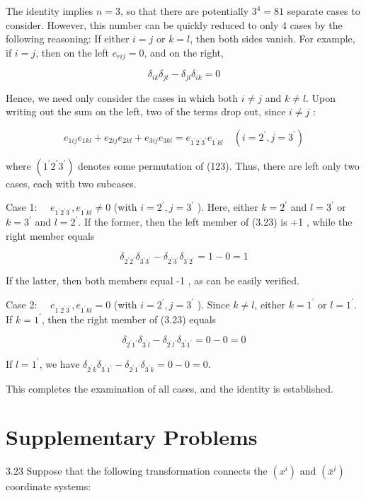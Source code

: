 \documentclass[10pt]{article}
\begin{document}
The identity implies $n=3$, so that there are potentially $3^{4}=81$ separate cases to consider. However, this number can be quickly reduced to only 4 cases by the following reasoning: If either $i=j$ or $k=l$, then both sides vanish. For example, if $i=j$, then on the left $e_{r i j}=0$, and on the right,

$$
\delta_{i k} \delta_{j t}-\delta_{j l} \delta_{i k}=0
$$

Hence, we need only consider the cases in which both $i \neq j$ and $k \neq l$. Upon writing out the sum on the left, two of the terms drop out, since $i \neq j$ :

$$
e_{1 i j} e_{1 k l}+e_{2 i j} e_{2 k l}+e_{3 i j} e_{3 k l}=e_{1^{\prime} 2^{\prime} 3^{\prime}} e_{1^{\prime} k l} \quad\left(i=2^{\prime}, j=3^{\prime}\right)
$$

where $\left(1^{\prime} 2^{\prime} 3^{\prime}\right)$ denotes some permutation of (123). Thus, there are left only two cases, each with two subcases.

Case 1: $\quad e_{1^{\prime} 2^{\prime} 3^{\prime}}, e_{1^{\prime} k l} \neq 0$ (with $i=2^{\prime}, j=3^{\prime}$ ). Here, either $k=2^{\prime}$ and $l=3^{\prime}$ or $k=3^{\prime}$ and $l=2^{\prime}$. If the former, then the left member of (3.23) is +1 , while the right member equals

$$
\delta_{2^{\prime} 2^{\prime}} \delta_{3^{\prime} 3^{\prime}}-\delta_{2^{\prime} 3^{\prime}} \delta_{3^{\prime} 2^{\prime}}=1-0=1
$$

If the latter, then both members equal -1 , as can be easily verified.

Case 2: $\quad e_{1^{\prime} 2^{\prime} 3^{\prime}}, e_{1^{\prime} k l}=0$ (with $i=2^{\prime}, j=3^{\prime}$ ). Since $k \neq l$, either $k=1^{\prime}$ or $l=1^{\prime}$. If $k=1^{\prime}$, then the right member of (3.23) equals

$$
\delta_{2^{\prime} 1^{\prime}} \delta_{3^{\prime} l}-\delta_{2^{\prime} l^{\prime}} \delta_{3^{\prime} 1^{\prime}}=0-0=0
$$

If $l=1^{\prime}$, we have $\delta_{2^{\prime} k} \delta_{3^{\prime} 1^{\prime}}-\delta_{2^{\prime} 1^{\prime}} \delta_{3^{\prime} k}=0-0=0$.

This completes the examination of all cases, and the identity is established.

\section*{Supplementary Problems}
3.23 Suppose that the following transformation connects the $\left(x^{i}\right)$ and $\left(\bar{x}^{i}\right)$ coordinate systems:
\end{document}
